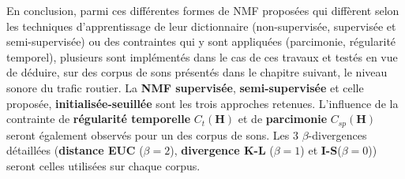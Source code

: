 En conclusion, parmi ces différentes formes de NMF proposées qui diffèrent selon les techniques d'apprentissage de leur dictionnaire (non-supervisée, supervisée et semi-supervisée) ou des contraintes qui y sont appliquées (parcimonie, régularité temporel), plusieurs sont implémentés dans le cas de ces travaux et testés en vue de déduire, sur des corpus de sons présentés dans le chapitre suivant, le niveau sonore du trafic routier.
La \textbf{NMF supervisée}, \textbf{semi-supervisée} et celle proposée, \textbf{initialisée-seuillée} sont les trois approches retenues. L'influence de la contrainte de \textbf{régularité temporelle} $C_t(\mathbf{H})$ et de \textbf{parcimonie} $C_{sp}(\mathbf{H})$ seront également observés pour un des corpus de sons. Les 3 $\beta$-divergences détaillées (\textbf{distance EUC} ($\beta = 2$), \textbf{divergence K-L} ($\beta = 1$) et \textbf{I-S}($\beta = 0$)) seront celles utilisées sur chaque corpus.


